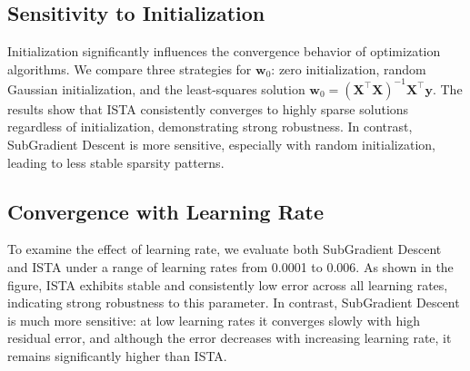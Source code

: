 \documentclass[11pt]{article}
\begin{document}
\subsection{Sensitivity to Initialization}

Initialization significantly influences the convergence behavior of optimization algorithms. We compare three strategies for  $\mathbf{w}_0$: zero initialization, random Gaussian initialization, and the least-squares solution \( \mathbf{w}_0 = (\mathbf{X}^\top \mathbf{X})^{-1} \mathbf{X}^\top \mathbf{y} \). The results show that ISTA consistently converges to highly sparse solutions regardless of initialization, demonstrating strong robustness. In contrast, SubGradient Descent is more sensitive, especially with random initialization, leading to less stable sparsity patterns.

\subsection{Convergence with Learning Rate}

To examine the effect of learning rate, we evaluate both SubGradient Descent and ISTA under a range of learning rates from 0.0001 to 0.006.
As shown in the figure, ISTA exhibits stable and consistently low error across all learning rates, indicating strong robustness to this parameter. In contrast, SubGradient Descent is much more sensitive: at low learning rates it converges slowly with high residual error, and although the error decreases with increasing learning rate, it remains significantly higher than ISTA.
\end{document}
